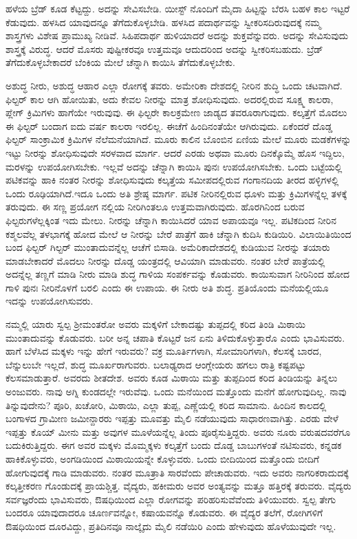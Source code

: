 ಹಳೆಯ ಬ್ರೆಡ್​ ಕೂಡ ಕೆಟ್ಟದ್ದು. ಅದನ್ನು ಸೇವಿಸಬೇಡಿ. ಯೀಸ್ಟ್​ ನೊಂದಿಗೆ ಮೈದಾ ಹಿಟ್ಟನ್ನು ಬೆರಸಿ ಬಹಳ ಕಾಲ ಇಟ್ಟರೆ ಕೆಡುವುದು. ಹಳಸಿದ ಯಾವುದನ್ನೂ ತೆಗೆದುಕೊಳ್ಳಬೇಡಿ. ಹಳಸಿದ ಪದಾರ್ಥವನ್ನು ಸ್ವೀಕರಿಸದಿರುವುದಕ್ಕೆ ನಮ್ಮ ಶಾಸ್ತ್ರಗಳು ವಿಶೇಷ ಪ್ರಾಮುಖ್ಯ ನೀಡಿವೆ. ಸಿಹಿಪದಾರ್ಥ ಹುಳಿಯಾದರೆ ಅದನ್ನು ಶುಕ್ತವೆನ್ನುವರು. ಅದನ್ನು ಸೇವಿಸುವುದು ಶಾಸ್ತ್ರಕ್ಕೆ ವಿರುದ್ಧ. ಆದರೆ ಮೊಸರು ಪುಷ್ಟೀಕರವೂ ಉತ್ತಮವೂ ಆದುದರಿಂದ ಅದನ್ನು ಸ್ವೀಕರಿಸಬಹುದು. ಬ್ರೆಡ್​ ತೆಗೆದುಕೊಳ್ಳಬೇಕಾದರೆ ಬೆಂಕಿಯ ಮೇಲೆ ಚೆನ್ನಾಗಿ ಕಾಯಿಸಿ ತೆಗೆದುಕೊಳ್ಳಬೇಕು.

ಅಶುದ್ಧ ನೀರು, ಅಶುದ್ಧ ಆಹಾರ ಎಲ್ಲಾ ರೋಗಕ್ಕೆ ತವರು. ಅಮೇರಿಕಾ ದೇಶದಲ್ಲಿ ನೀರಿನ ಶುದ್ಧಿ ಒಂದು ಚಟವಾಗಿದೆ. ಫಿಲ್ಟರ್​ ಕಾಲ ಆಗಿ ಹೋಯಿತು, ಅದು ಕೇವಲ ನೀರನ್ನು ಮಾತ್ರ ಶೋಧಿಸುವುದು. ಅದರಲ್ಲಿರುವ ಸೂಕ್ಷ್ಮ ಕಾಲರಾ, ಪ್ಲೇಗ್​ ಕ್ರಿಮಿಗಳು ಹಾಗೆಯೇ ಇರುವುವು. ಈ ಫಿಲ್ಟರೇ ಕಾಲಕ್ರಮೇಣ ಜಾಡ್ಯದ ತವರೂರಾಗುವುದು. ಕಲ್ಕತ್ತೆಗೆ ಮೊದಲು ಈ ಫಿಲ್ಟರ್​ ಬಂದಾಗ ಐದು ವರ್ಷ ಕಾಲರಾ ಇರಲಿಲ್ಲ. ಈಚೆಗೆ ಹಿಂದಿನಂತೆಯೇ ಆಗಿರುವುದು. ಏಕೆಂದರೆ ದೊಡ್ಡ ಫಿಲ್ಟರ್​ ಸಾಂಕ್ರಾಮಿಕ ಕ್ರಿಮಿಗಳ ನೆಲೆಮನೆಯಾಗಿದೆ. ಮೂರು ಕಾಲಿನ ಬೊಂಬಿನ ಏಣಿಯ ಮೇಲೆ ಮೂರು ಮಡಕೆಗಳನ್ನು ಇಟ್ಟು ನೀರನ್ನು ಶೋಧಿಸುವುದೇ ಸರಳವಾದ ಮಾರ್ಗ. ಆದರೆ ಎರಡು ಅಥವಾ ಮೂರು ದಿನಕ್ಕೊಮ್ಮೆ ಹೊಸ ಇದ್ದಿಲು, ಮರಳನ್ನು ಉಪಯೋಗಿಸಬೇಕು. ಇಲ್ಲವೆ ಅದನ್ನು ಚೆನ್ನಾಗಿ ಕಾಯಿಸಿ ಪುನಃ ಉಪಯೋಗಿಸಬೇಕು. ಒಂದು ಬಟ್ಟೆಯಲ್ಲಿ ಪಟಿಕವನ್ನು ಹಾಕಿ ನಂತರ ನೀರನ್ನು ಶೋಧಿಸುವುದು ಕಲ್ಕತ್ತೆಯ ಸಮೀಪದಲ್ಲಿರುವ ಗಂಗಾನದಿಯ ತೀರದ ಹಳ್ಳಿಗಳಲ್ಲಿ ಒಂದು ರೂಢಿಯಾಗಿದೆ.ಇದೂ ಒಂದು ಅತಿ ಶ್ರೇಷ್ಠ ಮಾರ್ಗ. ಪಟಿಕ ನೀರಿನಲ್ಲಿರುವ ಧೂಳು ಮತ್ತು ಕ್ರಿಮಿಗಳನ್ನೆಲ್ಲ ತಳಕ್ಕೆ ತರುವುದು. ಈ ಸಣ್ಣ ಪ್ರಯೋಗ ನಲ್ಲಿಯ ನೀರಿಗಿಂತಲೂ ಉತ್ತಮವಾಗಿರುವುದು. ಹೊರಗಿನಿಂದ ಬರುವ ಫಿಲ್ಟರುಗಳೆಲ್ಲಕ್ಕಿಂತ ಇದು ಮೇಲು. ನೀರನ್ನು ಚೆನ್ನಾಗಿ ಕಾಯಿಸಿದರೆ ಯಾವ ಅಪಾಯವೂ ಇಲ್ಲ. ಪಟಿಕದಿಂದ ನೀರಿನ ಕಶ್ಮಲವೆಲ್ಲ ತಳಭಾಗಕ್ಕೆ ಹೋದ ಮೇಲೆ ಆ ನೀರನ್ನು ಬೇರೆ ಪಾತ್ರೆಗೆ ಹಾಕಿ ಚೆನ್ನಾಗಿ ಕುದಿಸಿ ಕುಡಿಯಿರಿ. ವಿಲಾಯಿತಿಯಿಂದ ಬಂದ ಫಿಲ್ಟರ್​ ಗಿಲ್ಟರ್​ ಮುಂತಾದುವನ್ನೆಲ್ಲ ಆಚೆಗೆ ಬಿಸಾಡಿ. ಅಮೆರಿಕಾದೇಶದಲ್ಲಿ ಕುಡಿಯುವ ನೀರನ್ನು ತಯಾರು ಮಾಡಬೇಕಾದರೆ ಮೊದಲು ನೀರನ್ನು ದೊಡ್ಡ ಯಂತ್ರದಲ್ಲಿ ಆವಿಯಾಗಿ ಮಾಡುವರು. ನಂತರ ಬೇರೆ ಪಾತ್ರೆಯಲ್ಲಿ ಅದನ್ನೆಲ್ಲ ತಣ್ಣಗೆ ಮಾಡಿ ನೀರು ಮಾಡಿ ಶುದ್ಧ ಗಾಳಿಯ ಸಂಪರ್ಕವನ್ನು ಕೊಡುವರು. ಕಾಯಿಸುವಾಗ ನೀರಿನಿಂದ ಹೋದ ಗಾಳಿ ಪುನಃ ನೀರಿನೊಳಗೆ ಬರಲಿ ಎಂದು ಈ ಉಪಾಯ. ಈ ನೀರು ಅತಿ ಶುದ್ಧ. ಪ್ರತಿಯೊಂದು ಮನೆಯಲ್ಲಿಯೂ ಇದನ್ನು ಉಪಯೋಗಿಸುವರು.

ನಮ್ಮಲ್ಲಿ ಯಾರು ಸ್ವಲ್ಪ ಶ‍್ರೀಮಂತರೋ ಅವರು ಮಕ್ಕಳಿಗೆ ಬೇಕಾದಷ್ಟು ತುಪ್ಪದಲ್ಲಿ ಕರಿದ ತಿಂಡಿ ಮಿಠಾಯಿ ಮುಂತಾದುವನ್ನು ಕೊಡುವರು. ಬರೀ ಅನ್ನ ಚಪಾತಿ ಕೊಟ್ಟರೆ ಜನ ಏನು ತಿಳಿದುಕೊಳ್ಳುತ್ತಾರೊ ಎಂದು ಭಾವಿಸುವರು. ಹಾಗೆ ಬೆಳೆಸಿದ ಮಕ್ಕಳು ಇನ್ನು ಹೇಗೆ ಇರುವರು? ವಕ್ರ ಮೂರ್ತಿಗಳಾಗಿ, ಸೋಮಾರಿಗಳಾಗಿ, ಕೆಲಸಕ್ಕೆ ಬಾರದ, ಬೆನ್ನುಲುಬೇ ಇಲ್ಲದೆ, ಶುದ್ಧ ಮೂರ್ಖರಾಗುವರು. ಬಲಾಢ್ಯರಾದ ಆಂಗ್ಲೇಯರು ಹಗಲು ರಾತ್ರಿ ಕಷ್ಟಪಟ್ಟು ಕೆಲಸಮಾಡುತ್ತಾರೆ. ಅವರದು ಶೀತದೇಶ. ಅವರು ಕೂಡ ಮಿಠಾಯಿ ಮತ್ತು ತುಪ್ಪದಿಂದ ಕರಿದ ತಿಂಡಿಯನ್ನು ತಿನ್ನಲು ಅಂಜುವರು. ನಾವು ಅಗ್ನಿ ಕುಂಡದಲ್ಲೇ ಇರುವೆವು. ಒಂದು ಮನೆಯಿಂದ ಮತ್ತೊಂದು ಮನೆಗೆ ಹೋಗುವುದಿಲ್ಲ. ನಾವು ತಿನ್ನುವುದೇನು? ಪೂರಿ, ಖಚೋರಿ, ಮಿಠಾಯಿ, ಎಲ್ಲಾ ತುಪ್ಪ, ಎಣ್ಣೆಯಲ್ಲಿ ಕರಿದ ಸಾಮಾನು. ಹಿಂದಿನ ಕಾಲದಲ್ಲಿ ಬಂಗಾಳದ ಗ್ರಾಮೀಣ ಜಮೀನ್ದಾರರು ಇಪ್ಪತ್ತು ಮೂವತ್ತು ಮೈಲಿ ನಡೆಯುವುದು ಸಾಧಾರಣವಾಗಿತ್ತು. ಎರಡು ವೇಳೆ ಇಪ್ಪತ್ತು ಕೊಯ್​ ಮೀನು ಮತ್ತು ಅವುಗಳ ಮೂಳೆ\break ಯನ್ನೆಲ್ಲ ತಿಂದು ಪೂರೈಸುತ್ತಿದ್ದರು. ಅವರು ನೂರು ವರುಷದವರೆಗೂ ಬದುಕಿರುತ್ತಿದ್ದರು. ಈಗ ಅವರ ಮಕ್ಕಳು ಮೊಮ್ಮಕ್ಕಳು ಕಲ್ಕತ್ತೆಗೆ ಬಂದು ದೊಡ್ಡ ಬಾಬುಗಳಂತೆ ನಟಿಸುವರು, ಕನ್ನಡಕ ಹಾಕಿಕೊಳ್ಳುವರು, ಅಂಗಡಿಯಿಂದ ಮಿಠಾಯಿಯನ್ನೇ ಕೊಳ್ಳುವರು. ಒಂದು ಬೀದಿಯಿಂದ ಮತ್ತೊಂದು ಬೀದಿಗೆ ಹೋಗುವುದಕ್ಕೆ ಗಾಡಿ ಮಾಡುವರು. ನಂತರ ಮೂತ್ರಾತಿ ಸಾರವೆಂದು ಪೇಚಾಡುವರು. ಇದು ಅವರು ನಾಗರಿಕರಾದುದಕ್ಕೆ ಕಲ್ಕತ್ತೀಕರಣ ಗೊಂಡುದಕ್ಕೆ ಪ್ರಾಯಶ್ಚಿತ್ತ. ವೈದ್ಯರು, ಹಕೀಮರು ಅವರ ಅಂತ್ಯವನ್ನು ಮತ್ತೂ ಹತ್ತಿರಕ್ಕೆ ತರುವರು. ವೈದ್ಯರು ಸರ್ವಜ್ಞರೆಂದು ಭಾವಿಸುವರು, ಔಷಧಿಯಿಂದ ಎಲ್ಲಾ ರೋಗವನ್ನು ಪರಿಹರಿಸುವೆ\break ವೆಂದು ತಿಳಿಯುವರು. ಸ್ವಲ್ಪ ತೇಗು ಬಂದರೂ ಯಾವುದಾದರೂ ಚೂರ್ಣವನ್ನೋ, ಕಷಾಯವನ್ನೊ ಕೊಡುವರು. ಈ ವೈದ್ಯರ ತಲೆಗೆ, ರೋಗಿಗಳಿಗೆ ಔಷಧಿಯಿಂದ ದೂರವಿದ್ದು, ಪ್ರತಿದಿನವೂ ನಾಲ್ಕೈದು ಮೈಲಿ ನಡೆಯಿರಿ ಎಂದು ಹೇಳುವುದು ಹೊಳೆಯುವುದೇ ಇಲ್ಲ.


